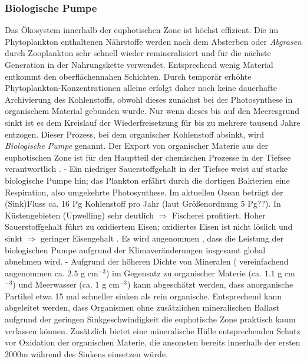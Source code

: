 \documentclass[12pt,a4paper,onecolumn]{scrartcl}
\begin{document}
\subsubsection{Biologische Pumpe} \label{sec:biopump}
Das Ökosystem innerhalb der euphotischen Zone ist höchst effizient. Die im Phytoplankton enthaltenen Nährstoffe werden nach dem Absterben oder \textit{Abgrasen} durch Zooplankton sehr schnell wieder remineralisiert und für die nächste Generation in der Nahrungskette verwendet. Entsprechend wenig Material entkommt den oberflächennahen Schichten. Durch temporär erhöhte Phytoplankton-Konzentrationen alleine erfolgt daher noch keine dauerhafte Archivierung des Kohlenstoffs, obwohl dieses zunächst bei der Photosynthese in organischem Material gebunden wurde. Nur wenn dieses bis auf den Meeresgrund sinkt ist es dem Kreislauf der Wiederfreisetzung für bis zu mehrere tausend Jahre entzogen. Dieser Prozess, bei dem organischer Kohlenstoff absinkt, wird \textit{Biologische Pumpe} genannt. Der Export von organischer Materie aus der euphotischen Zone ist für den Hauptteil der chemischen Prozesse in der Tiefsee verantwortlich \citep{Emerson.2009}. - Ein niedriger Sauerstoffgehalt in der Tiefsee weist auf starke biologische Pumpe hin; das Plankton erfährt durch die dortigen Bakterien eine Respiration, also umgekehrte Photosynthese. Im aktuellen Ozean beträgt der (Sink)Fluss ca. 16 Pg Kohlenstoff pro Jahr \citep{Falkowski.1998} (laut \citet{Emerson.2009} Größenordnung 5  Pg??). In Küstengebieten (Upwelling) sehr deutlich $\Rightarrow$ Fischerei profitiert. Hoher Sauerstoffgehalt führt zu oxidiertem Eisen; oxidiertes Eisen ist nicht löslich und sinkt $\Rightarrow$ geringer Eisengehalt \citep{Falkowski.1998}. Es wird angenommen , dass die Leistung der biologischen Pumpe aufgrund der Klimaveränderungen insgesamt global abnehmen wird. - Aufgrund der höheren Dichte von Mineralen ( vereinfachend angenommen ca. $2.5$ g cm$^{-3}$) im Gegensatz zu organischer Materie (ca. $1.1$ g cm$^{-3}$)  und Meerwasser (ca. $1$ g cm$^{-3}$) kann abgeschätzt werden, dass anorganische Partikel etwa 15 mal schneller sinken als rein organische. Entsprechend kann abgeleitet werden, dass Organismen ohne zusätzlichen mineralischen Ballast aufgrund der geringen Sinkgeschwindigkeit die euphotische Zone praktisch kaum verlassen können. Zusätzlich bietet eine mineralische Hülle entsprechenden Schutz vor Oxidation der organischen Materie, die ansonsten bereits innerhalb der ersten 2000m während des Sinkens einsetzen würde\citep{Emerson.2009}.
\end{document}
